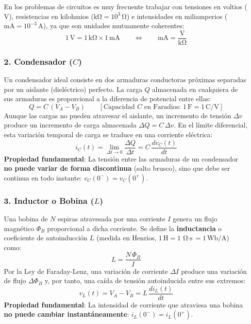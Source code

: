 \begin{aviso}
En los problemas de circuitos es muy frecuente trabajar con tensiones en voltios ($\si{\volt}$), resistencias en kilohmios ($\si{\kilo\ohm} = 10^3\,\si{\ohm}$) e intensidades en miliamperios ($\si{\milli\ampere} = 10^{-3}\,\si{\ampere}$), ya que son unidades mutuamente coherentes:
\begin{equation}
    1\,\si{\volt} = 1\,\si{\kilo\ohm} \times 1\,\si{\milli\ampere} \qquad \Longleftrightarrow \qquad \si{\milli\ampere} = \frac{\si{\volt}}{\si{\kilo\ohm}}
\end{equation}
\end{aviso}

\subsubsection{2. Condensador ($C$)}
Un condensador ideal consiste en dos armaduras conductoras próximas separadas por un aislante (dieléctrico) perfecto. La carga $Q$ almacenada en cualquiera de sus armaduras es proporcional a la diferencia de potencial entre ellas:
\begin{equation}
    Q = C\,(V_A - V_B) \qquad [\text{Capacidad } C \text{ en Faradios: } 1\,\si{\farad} = 1\,\si{\coulomb/\volt}]
\end{equation}
Aunque las cargas no pueden atravesar el aislante, un incremento de tensión $\Delta v$ produce un incremento de carga almacenada $\Delta Q = C\,\Delta v$. En el límite diferencial, esta variación temporal de carga se traduce en una corriente eléctrica:
\begin{equation}
    i_C(t) = \lim_{\Delta t \to 0} \frac{\Delta Q}{\Delta t} = C\,\frac{dv_C(t)}{dt}
\end{equation}
\textbf{Propiedad fundamental}: La tensión entre las armaduras de un condensador \textbf{no puede variar de forma discontinua} (salto brusco), sino que debe ser continua en todo instante: $v_C(0^-) = v_C(0^+)$.

\subsubsection{3. Inductor o Bobina ($L$)}
Una bobina de $N$ espiras atravesada por una corriente $I$ genera un flujo magnético $\Phi_B$ proporcional a dicha corriente. Se define la \textbf{inductancia} o coeficiente de autoinducción $L$ (medida en Henrios, $1\,\si{\henry} = 1\,\si{\ohm\cdot\second} = 1\,\si{\weber/\ampere}$) como:
\begin{equation}
    L = \frac{N\,\Phi_B}{I}
\end{equation}
Por la Ley de Faraday-Lenz, una variación de corriente $\Delta I$ produce una variación de flujo $\Delta \Phi_B$ y, por tanto, una caída de tensión autoinducida entre sus extremos:
\begin{equation}
    v_L(t) = V_A - V_B = L\,\frac{di_L(t)}{dt}
\end{equation}
\textbf{Propiedad fundamental}: La intensidad de corriente que atraviesa una bobina \textbf{no puede cambiar instantáneamente}: $i_L(0^-) = i_L(0^+)$.

